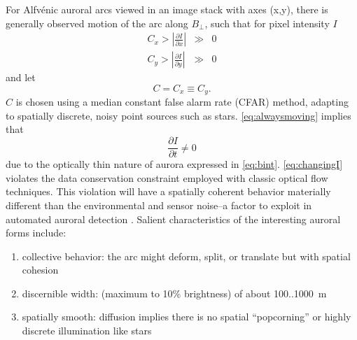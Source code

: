 For Alfvénic auroral arcs viewed in an image stack with axes (x,y), there is generally observed motion of the arc along $B_\perp$, such that for pixel intensity $I$
\begin{eqnarray}\label{eq:alwaysmoving}
C_x > \left|\frac{\partial I}{\partial x}\right| & \gg & 0 \\
C_y > \left|\frac{\partial I}{\partial y}\right| & \gg & 0 \nonumber
\end{eqnarray}
and let
\begin{equation}
 C = C_x \equiv C_y.
\end{equation}
$C$ is chosen using a median constant false alarm rate (CFAR) method, adapting to spatially discrete, noisy point sources such as stars.
\eqref{eq:alwaysmoving} implies that
\begin{equation}\label{eq:changingI}
\frac{\partial I}{\partial t} \neq 0
\end{equation}
due to the optically thin nature of aurora expressed in \eqref{eq:bint}.
\eqref{eq:changingI} violates the data conservation constraint employed with classic optical flow techniques.
This violation will have a spatially coherent behavior materially different than the environmental and sensor noise--a factor to exploit in automated auroral detection \citep{blixt2006}.
Salient characteristics of the interesting auroral forms include:
\begin{enumerate}
    \item collective behavior: the arc might deform, split, or translate but with spatial cohesion
    \item discernible width: (maximum to 10\% brightness) of about 100..1000~m 
    \item spatially smooth: diffusion implies there is no spatial ``popcorning'' or highly discrete illumination like stars
\end{enumerate}
